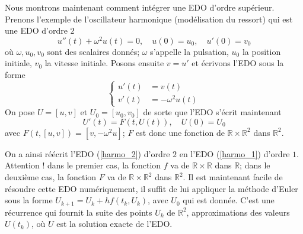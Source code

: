 \documentclass{exam}
\begin{document}
\begin{questions}

\question
Nous montrons maintenant comment intégrer une EDO d'ordre supérieur. 
Prenons l'exemple de l'oscillateur harmonique (modélisation du ressort) qui est une EDO d'ordre $2$
\begin{equation}
\label{harmo_2}
u''(t) + \omega^2 u(t) = 0,\quad u(0) = u_0, \quad u'(0) = v_0
\end{equation}
où $\omega, u_0, v_0$ sont des scalaires donnés; $\omega$ s'appelle la pulsation, $u_0$ la position initiale, $v_0$ la vitesse initiale.
Posons ensuite $v = u'$ et écrivons l'EDO sous la forme
\begin{equation}
\label{harmonic}
\left\{
\begin{aligned}
u'(t) &=  v(t) \\
v'(t) &=  -\omega^2u(t)
\end{aligned}
\right.
\end{equation}
On pose $U = [u, v]$ et $U_0 = [u_0, v_0]$ de sorte que l'EDO s'écrit maintenant
\begin{equation}
\label{harmo_1}
U'(t) = F(t, U(t)),\quad U(0) = U_0
\end{equation}
avec $F(t, [u, v]) = [v, -\omega^2u]$; $F$ est donc une fonction de $\mathbb{R}\times \mathbb{R}^2$ dans $\mathbb{R}^2$.

On a ainsi réécrit l'EDO (\ref{harmo_2}) d'ordre $2$ en l'EDO (\ref{harmo_1}) d'ordre $1$. Attention ! dans le premier cas, la fonction $f$ va de  $\mathbb{R}\times \mathbb{R}$ dans $\mathbb{R}$; dans le deuxième cas, la fonction $F$ va de $\mathbb{R}\times \mathbb{R}^2$ dans $\mathbb{R}^2$.
Il est maintenant facile de résoudre cette EDO numériquement, il suffit de lui appliquer la méthode d'Euler sous la forme $U_{k+1} = U_k + hf(t_k, U_k)$, avec $U_0$ qui est donnée. C'est une récurrence qui fournit la suite des points $U_k$ de $\mathbb{R}^2$, approximations des valeurs $U(t_k)$, où $U$ est la solution exacte de l'EDO.


\end{questions}
\end{document}
